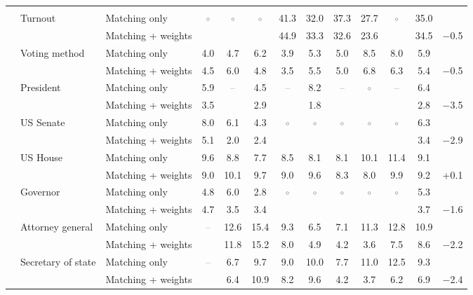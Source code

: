 \begin{table}[!htbp]
{\begin{threeparttable}
\begin{tabular}{llcccccccccc}
\addlinespace[0.3em]
\multicolumn{12}{l}{Non-demographic} \\
\addlinespace[0.1em]
~~Turnout & Matching only & \textcolor{gray}{$\circ$} & \textcolor{gray}{$\circ$} & \textcolor{gray}{$\circ$} & 41.3 & 32.0 & 37.3 & 27.7 & \textcolor{gray}{$\circ$} & 35.0 & \\
 & Matching + weights &  &  &  & 44.9 & 33.3 & 32.6 & 23.6 &  & 34.5 & $-$0.5 \\
\addlinespace[0.1em]
~~Voting method & Matching only & 4.0 & 4.7 & 6.2 & 3.9 & 5.3 & 5.0 & 8.5 & 8.0 & 5.9 & \\
 & Matching + weights & 4.5 & 6.0 & 4.8 & 3.5 & 5.5 & 5.0 & 6.8 & 6.3 & 5.4 & $-$0.5 \\
\addlinespace[0.1em]
~~President & Matching only & 5.9 & \textcolor{gray}{--} & 4.5 & \textcolor{gray}{--} & 8.2 & \textcolor{gray}{--} & \textcolor{gray}{$\circ$} & \textcolor{gray}{--} & 6.4 & \\
 & Matching + weights & 3.5 &  & 2.9 &  & 1.8 &  &  &  & 2.8 & $-$3.5 \\
\addlinespace[0.1em]
~~US Senate & Matching only & 8.0 & 6.1 & 4.3 & \textcolor{gray}{$\circ$} & \textcolor{gray}{$\circ$} & \textcolor{gray}{$\circ$} & \textcolor{gray}{$\circ$} & \textcolor{gray}{$\circ$} & 6.3 & \\
 & Matching + weights & 5.1 & 2.0 & 2.4 &  &  &  &  &  & 3.4 & $-$2.9 \\
\addlinespace[0.1em]
~~US House & Matching only & 9.6 & 8.8 & 7.7 & 8.5 & 8.1 & 8.1 & 10.1 & 11.4 & 9.1 & \\
 & Matching + weights & 9.0 & 10.1 & 9.7 & 9.0 & 9.6 & 8.3 & 8.0 & 9.9 & 9.2 & +0.1 \\
\addlinespace[0.1em]
~~Governor & Matching only & 4.8 & 6.0 & 2.8 & \textcolor{gray}{$\circ$} & \textcolor{gray}{$\circ$} & \textcolor{gray}{$\circ$} & \textcolor{gray}{$\circ$} & \textcolor{gray}{$\circ$} & 5.3 & \\
 & Matching + weights & 4.7 & 3.5 & 3.4 &  &  &  &  &  & 3.7 & $-$1.6 \\
\addlinespace[0.1em]
~~Attorney general & Matching only & \textcolor{gray}{--} & 12.6 & 15.4 & 9.3 & 6.5 & 7.1 & 11.3 & 12.8 & 10.9 & \\
 & Matching + weights &  & 11.8 & 15.2 & 8.0 & 4.9 & 4.2 & 3.6 & 7.5 & 8.6 & $-$2.2 \\
\addlinespace[0.1em]
~~Secretary of state & Matching only & \textcolor{gray}{--} & 6.7 & 9.7 & 9.0 & 10.0 & 7.7 & 11.0 & 12.5 & 9.3 & \\
 & Matching + weights &  & 6.4 & 10.9 & 8.2 & 9.6 & 4.2 & 3.7 & 6.2 & 6.9 & $-$2.4 \\

\end{tabular}
\end{threeparttable}}
\end{table}
